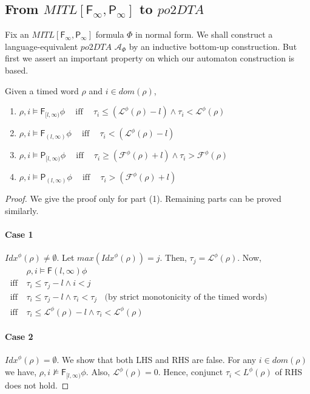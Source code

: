 \documentclass{llncs}
\newcommand{\fif}{\rmiff}
\newcommand{\rmiff}{\mathbin{~\mbox{iff}~}}
\newcommand{\fut}{\textsf{F}}
\newcommand{\past}{\textsf{P}}
\newcommand{\potdta}{\mbox{$\mathit{po2DTA}$}}
\newcommand{\autm}{\mathcal A}
\newcommand{\mitlfpinf}{\mbox{$\mathit{MITL[\fut_\infty,\past_\infty]}$}}
\newcommand{\idx}{\mathit{Idx}}
\newcommand{\frst}{{\mathcal F}}
\newcommand{\lst}{{\mathcal L}}
\begin{document}
\subsection{From \mitlfpinf\/ to \potdta}
Fix an \mitlfpinf\/ formula $\Phi$ in normal form. We shall construct a language-equivalent \potdta\/ $\autm_\Phi$ by an inductive bottom-up construction. But first we assert an important property on which our automaton construction is based. \begin{lemma}\label{lem:inftychar} Given a timed word $\rho$ and $i\in dom(\rho)$,
\begin{enumerate}
 \item $\rho,i \models \fut_{[l,\infty)}\phi  \quad \fif  \quad 
  \tau_i \leq (\lst^\phi(\rho) - l) \land \tau_i <  \lst^\phi(\rho)$ 
 \item $\rho,i \models \fut_{(l,\infty)}\phi  \quad \fif  \quad 
  \tau_i < (\lst^\phi(\rho) - l)$ 
 \item $\rho,i \models \past_{[l,\infty)}\phi  \quad \fif  \quad 
  \tau_i \geq (\frst^\phi(\rho) + l) \land \tau_i >  \frst^\phi(\rho)$ 
 \item $\rho,i \models \past_{(l,\infty)}\phi  \quad \fif  \quad 
  \tau_i > (\frst^\phi(\rho) + l)$ 
\end{enumerate}
\end{lemma}
\begin{proof} We give the proof only for part (1). Remaining parts can be proved similarly.
\paragraph{Case 1} $\idx^\phi(\rho) \not= \emptyset$. Let $max(\idx^\phi(\rho))=j$.
Then, $\tau_j=\lst^\phi(\rho)$. Now, \\
$\begin{array}{ll}
       & \rho,i \models \fut{(l,\infty)} \phi \\
 \fif &  \tau_i \leq \tau_j -l \land i < j \\
\fif &  \tau_i \leq \tau_j -l \land \tau_i < \tau_j ~~~~ \mbox{(by strict monotonicity of the timed words)}\\
 \fif &  \tau_i \leq \lst^\phi(\rho) - l \land \tau_i < \lst^\phi(\rho)
\end{array}
$
\paragraph{Case 2} $\idx^\phi(\rho) = \emptyset$. We show that both LHS and RHS are false. For any $i \in dom(\rho)$ we have,  $\rho,i \not \models \fut_{[l,\infty)}\phi $. Also, $\lst^\phi(\rho)=0$. Hence,  conjunct $\tau_i < L^\phi(\rho)$ of RHS does not hold.
\end{proof}
\end{document}
